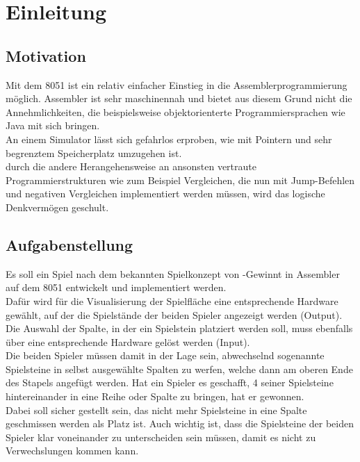 



\newcommand{\autor}{Heidinger, Matthis, Riesinger, Stephan}
\newcommand{\kurs}{TINF17B1}
\newcommand{\titel}{4-Gewinnt auf einem Mikrocomputer der 8051-Famile}



\tableofcontents 

\chapter{Einleitung}

\section{Motivation}

Mit dem 8051 ist ein relativ einfacher Einstieg in die Assemblerprogrammierung möglich. Assembler ist sehr maschinennah und bietet aus diesem Grund 
nicht die Annehmlichkeiten, die beispielsweise objektorienterte Programmiersprachen wie Java mit sich bringen.\\
An einem Simulator lässt sich gefahrlos erproben, wie mit Pointern und sehr begrenztem Speicherplatz umzugehen ist.\\
durch die andere Herangehensweise an ansonsten vertraute Programmierstrukturen wie zum Beispiel Vergleichen, die nun mit Jump-Befehlen und negativen
Vergleichen implementiert werden müssen, wird das logische Denkvermögen geschult.

\section{Aufgabenstellung}

Es soll ein Spiel nach dem bekannten Spielkonzept von -Gewinnt\grqq{} in Assembler auf dem 8051 entwickelt und 
implementiert werden.\\
Dafür wird für die Visualisierung der Spielfläche eine entsprechende Hardware gewählt, 
auf der die Spielstände der beiden Spieler angezeigt werden (Output). Die Auswahl der Spalte, in der ein 
\glqq Spielstein\grqq{} platziert werden soll, muss ebenfalls über eine entsprechende Hardware gelöst werden (Input).\\
Die beiden Spieler müssen damit in der Lage sein, abwechselnd sogenannte Spielsteine in selbst ausgewählte Spalten zu werfen, 
welche dann am oberen Ende des Stapels angefügt werden. Hat ein Spieler es geschafft, 4 seiner Spielsteine hintereinander 
in eine Reihe oder Spalte zu bringen, hat er gewonnen.\\
Dabei soll sicher gestellt sein, das nicht mehr Spielsteine in eine Spalte geschmissen werden als Platz ist. Auch wichtig ist, dass die Spielsteine
der beiden Spieler klar voneinander zu unterscheiden sein müssen, damit es nicht zu Verwechslungen kommen kann. 

